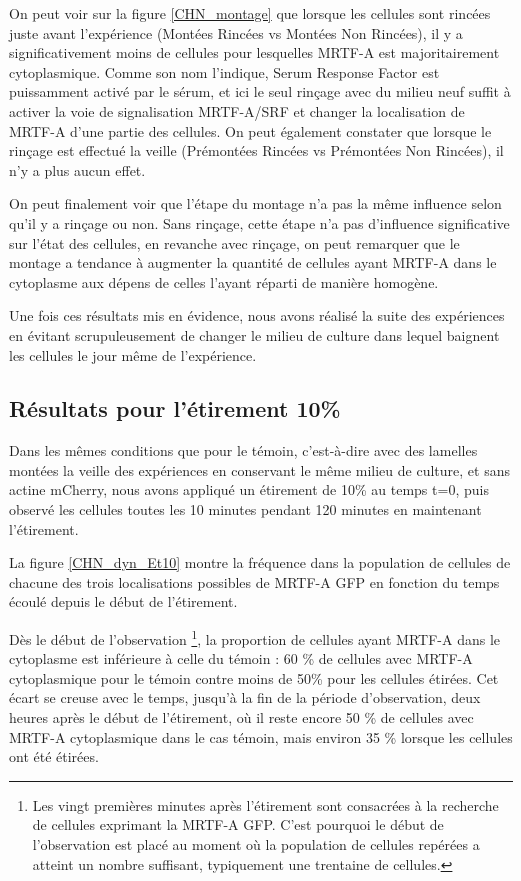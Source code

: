 On peut voir sur la figure \ref{CHN_montage} que lorsque les cellules sont rincées juste avant l'expérience (Montées Rincées vs Montées Non Rincées), il y a significativement moins de cellules pour lesquelles MRTF-A est majoritairement cytoplasmique. 
Comme son nom l'indique, Serum Response Factor est puissamment activé par le sérum, et ici le seul rinçage avec du milieu neuf suffit à activer la voie de signalisation MRTF-A/SRF et changer la localisation de MRTF-A d'une partie des cellules. 
On peut également constater que lorsque le rinçage est effectué la veille (Prémontées Rincées vs Prémontées Non Rincées), il n'y a plus aucun effet. 

On peut finalement voir que l'étape du montage n'a pas la même influence selon qu'il y a rinçage ou non. Sans rinçage, cette étape n'a pas d'influence significative sur l'état des cellules, en revanche avec rinçage, on peut remarquer que le montage a tendance à augmenter la quantité de cellules ayant MRTF-A dans le cytoplasme aux dépens de celles l'ayant réparti de manière homogène. 

Une fois ces résultats mis en évidence, nous avons réalisé la suite des expériences en évitant scrupuleusement de changer le milieu de culture dans lequel baignent les cellules le jour même de l'expérience. 




\subsection{Résultats pour l'étirement 10\%}

Dans les mêmes conditions que pour le témoin, c'est-à-dire avec des lamelles montées la veille des expériences en conservant le même milieu de culture, et sans actine mCherry, nous avons appliqué un étirement de 10\% au temps t=0, puis observé les cellules toutes les 10 minutes pendant 120 minutes en maintenant l'étirement. 

La figure \ref{CHN_dyn_Et10} montre la fréquence dans la population de cellules de chacune des trois localisations possibles de MRTF-A GFP en fonction du temps écoulé depuis le début de l'étirement. 
 
Dès le début de l'observation \footnote{Les vingt premières minutes après l'étirement sont consacrées à la recherche de cellules exprimant la MRTF-A GFP. C'est pourquoi le début de l'observation est placé au moment où la population de cellules repérées a atteint un nombre suffisant, typiquement une trentaine de cellules.}, la proportion de cellules ayant MRTF-A dans le cytoplasme est inférieure à celle du témoin : 60 \% de cellules avec MRTF-A cytoplasmique pour le témoin contre moins de 50\% pour les cellules étirées. Cet écart se creuse avec le temps, jusqu'à la fin de la période d'observation, deux heures après le début de l'étirement, où il reste encore 50 \% de cellules avec MRTF-A cytoplasmique dans le cas témoin, mais environ 35 \% lorsque les cellules ont été étirées. 


